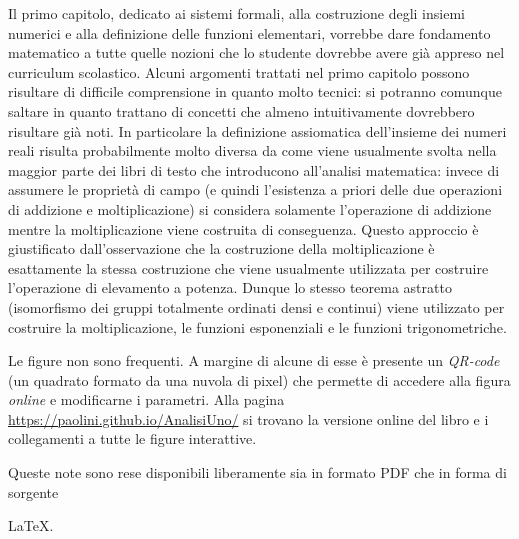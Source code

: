 Il primo capitolo, dedicato ai sistemi formali, alla costruzione %
degli insiemi numerici e alla definizione delle funzioni elementari, %
vorrebbe dare fondamento matematico a tutte quelle nozioni che %
lo studente dovrebbe avere già appreso nel curriculum scolastico. %
Alcuni argomenti trattati nel primo capitolo possono risultare %
di difficile comprensione in quanto molto tecnici: %
si potranno comunque saltare in quanto trattano di concetti %
che almeno intuitivamente dovrebbero risultare già noti. %
In particolare la definizione assiomatica dell'insieme %
dei numeri reali risulta probabilmente molto diversa da %
come viene usualmente svolta nella maggior parte dei libri di testo %
che introducono all'analisi matematica: %
invece di assumere le proprietà di campo (e quindi l'esistenza %
a priori delle due operazioni di addizione e moltiplicazione) %
si considera solamente l'operazione di addizione %
mentre la moltiplicazione viene costruita di conseguenza. %
Questo approccio è giustificato dall'osservazione che %
la costruzione della moltiplicazione è esattamente la stessa %
costruzione che viene usualmente utilizzata per costruire %
l'operazione di elevamento a potenza. %
Dunque lo stesso teorema astratto %
(isomorfismo dei gruppi totalmente ordinati densi e continui) %
viene utilizzato per costruire la moltiplicazione, %
le funzioni esponenziali e le funzioni trigonometriche. %

Le figure non sono frequenti. A margine di alcune di esse %
è presente un \emph{QR-code} (un quadrato formato da una nuvola di pixel) %
che permette di accedere alla figura  %
\emph{online} e modificarne i parametri.  %
Alla pagina \url{https://paolini.github.io/AnalisiUno/} 
si trovano la versione online del libro e 
i collegamenti a tutte le figure interattive.

Queste note sono rese disponibili liberamente sia in formato PDF che %
in forma di sorgente %

\LaTeX{}.


